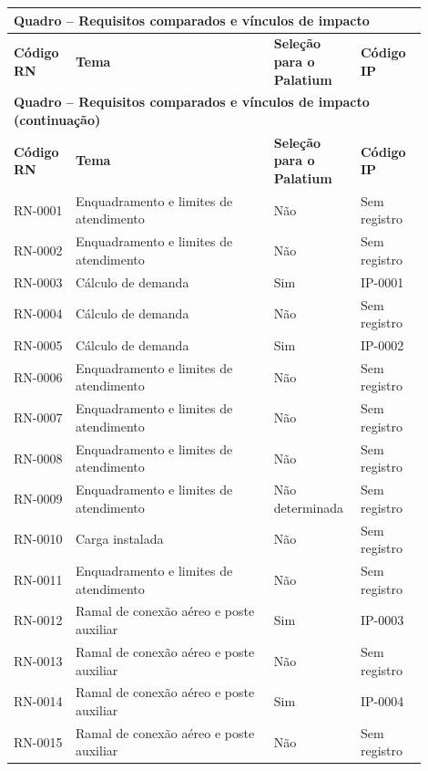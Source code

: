 \begingroup
\small
\setlength{\tabcolsep}{4pt}
\renewcommand{\arraystretch}{1.15}
\label{qua:resumo-rn-ip}
\begin{longtable}{|p{0.14\linewidth}|p{0.45\linewidth}|p{0.16\linewidth}|p{0.15\linewidth}|}
\multicolumn{4}{l}{\textbf{Quadro \thequadro{} -- Requisitos comparados e vínculos de impacto}}\\\hline
\textbf{Código RN} & \textbf{Tema} & \textbf{Seleção para o Palatium} & \textbf{Código IP}\\\hline
\endfirsthead
\multicolumn{4}{l}{\textbf{Quadro \thequadro{} -- Requisitos comparados e vínculos de impacto (continuação)}}\\\hline
\textbf{Código RN} & \textbf{Tema} & \textbf{Seleção para o Palatium} & \textbf{Código IP}\\\hline
\endhead
RN-0001 & Enquadramento e limites de atendimento & Não & Sem registro \\\hline
RN-0002 & Enquadramento e limites de atendimento & Não & Sem registro \\\hline
RN-0003 & Cálculo de demanda & Sim & IP-0001 \\\hline
RN-0004 & Cálculo de demanda & Não & Sem registro \\\hline
RN-0005 & Cálculo de demanda & Sim & IP-0002 \\\hline
RN-0006 & Enquadramento e limites de atendimento & Não & Sem registro \\\hline
RN-0007 & Enquadramento e limites de atendimento & Não & Sem registro \\\hline
RN-0008 & Enquadramento e limites de atendimento & Não & Sem registro \\\hline
RN-0009 & Enquadramento e limites de atendimento & Não determinada & Sem registro \\\hline
RN-0010 & Carga instalada & Não & Sem registro \\\hline
RN-0011 & Enquadramento e limites de atendimento & Não & Sem registro \\\hline
RN-0012 & Ramal de conexão aéreo e poste auxiliar & Sim & IP-0003 \\\hline
RN-0013 & Ramal de conexão aéreo e poste auxiliar & Não & Sem registro \\\hline
RN-0014 & Ramal de conexão aéreo e poste auxiliar & Sim & IP-0004 \\\hline
RN-0015 & Ramal de conexão aéreo e poste auxiliar & Não & Sem registro \\\hline

\end{longtable}
